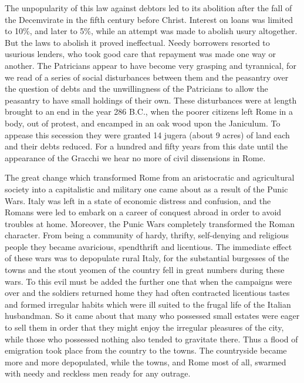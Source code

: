 \documentclass{book}
\begin{document}
The unpopularity of this law against debtors led to its abolition after the fall of the Decemvirate in the fifth century before Christ. Interest on loans was limited to 10\%, and later to 5\%, while an attempt was made to abolish usury altogether. But the laws to abolish it proved ineffectual. Needy borrowers resorted to usurious lenders, who took good care that repayment was made one way or another. The Patricians appear to have become very grasping and tyrannical, for we read of a series of social disturbances between them and the peasantry over the question of debts and the unwillingness of the Patricians to allow the peasantry to have small holdings of their own. These disturbances were at length brought to an end in the year 286 B.C., when the poorer citizens left Rome in a body, out of protest, and encamped in an oak wood upon the Janiculum. To appease this secession they were granted 14 jugera (about 9 acres) of land each and their debts reduced. For a hundred and fifty years from this date until the appearance of the Gracchi we hear no more of civil dissensions in Rome.

The great change which transformed Rome from an aristocratic and agricultural society into a capitalistic and military one came about as a result of the Punic Wars. Italy was left in a state of economic distress and confusion, and the Romans were led to embark on a career of conquest abroad in order to avoid troubles at home. Moreover, the Punic Wars completely transformed the Roman character. From being a community of hardy, thrifty, self-denying and religious people they became avaricious, spendthrift and licentious. The immediate effect of these wars was to depopulate rural Italy, for the substantial burgesses of the towns and the stout yeomen of the country fell in great numbers during these wars. To this evil must be added the further one that when the campaigns were over and the soldiers returned home they had often contracted licentious tastes and formed irregular habits which were ill suited to the frugal life of the Italian husbandman. So it came about that many who possessed small estates were eager to sell them in order that they might enjoy the irregular pleasures of the city, while those who possessed nothing also tended to gravitate there. Thus a flood of emigration took place from the country to the towns. The countryside became more and more depopulated, while the towns, and Rome most of all, swarmed with needy and reckless men ready for any outrage.
\end{document}
